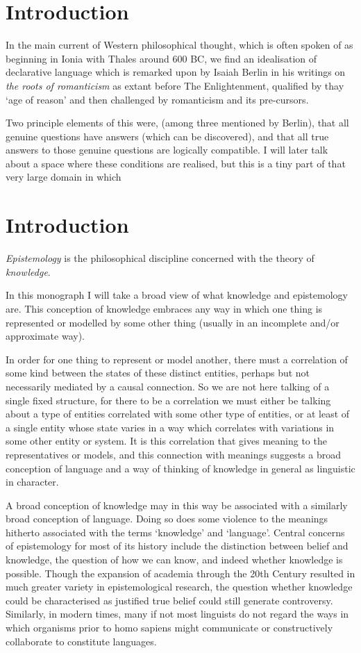 \documentclass[10pt,titlepage]{book}
\begin{document}
\chapter{Introduction}

In the main current of Western philosophical thought, which is often spoken of as beginning in Ionia with Thales around 600 BC, we find an idealisation of declarative language which is remarked upon by Isaiah Berlin in his writings on \emph{the roots of romanticism} \cite{berlinRR} as extant before The Enlightenment, qualified by thay `age of reason' and then challenged by romanticism and its pre-cursors.

Two principle elements of this were, (among three mentioned by Berlin), that all genuine questions have answers (which can be discovered), and that all true answers to those genuine questions are logically compatible.
I will later talk about a space where these conditions are realised, but this is a tiny part of that very large domain in which 



\chapter{Introduction}

\emph{Epistemology} is the philosophical discipline concerned with the theory of \emph{knowledge}.

In this monograph I will take a broad view of what knowledge and epistemology are.
This conception of knowledge embraces any way in which one thing is represented or modelled by some other thing (usually in an incomplete and/or approximate way).

In order for one thing to represent or model another, there must a correlation of some kind between the states of these distinct entities, perhaps but not necessarily mediated by a causal connection.
So we are not here talking of a single fixed structure, for there to be a correlation we must either be talking about a type of entities correlated with some other type of entities, or at least of a single entity whose state varies in a way which correlates with variations in some other entity or system.
It is this correlation that gives meaning to the representatives or models, and this connection with meanings suggests a broad conception of language and a way of thinking of knowledge in general as linguistic in character.

A broad conception of knowledge may in this way be associated with a similarly broad conception of language.
Doing so does some violence to the meanings hitherto associated with the terms `knowledge' and `language'.
Central concerns of epistemology for most of its history include the distinction between belief and knowledge, the question of how we can know, and indeed whether knowledge is possible.
Though the expansion of academia through the 20th Century resulted in much greater variety in epistemological research, the question whether knowledge could be characterised as justified true belief could still generate controversy.
Similarly, in modern times, many if not most linguists do not regard the ways in which organisms prior to homo sapiens might communicate or constructively collaborate to constitute languages.
\end{document}
